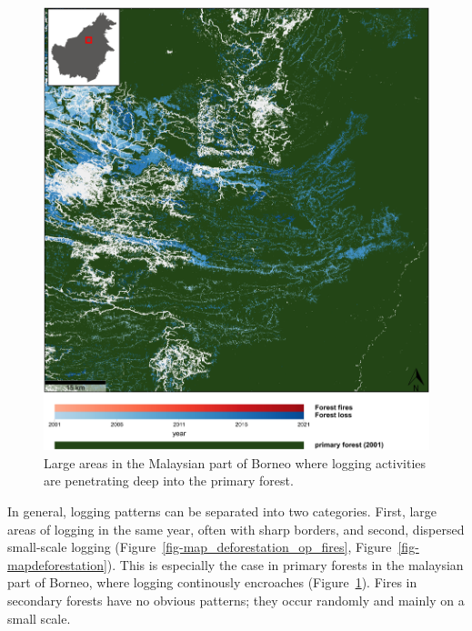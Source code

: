 \documentclass[
  letterpaper,
  DIV=11,
  numbers=noendperiod]{scrreprt}
\begin{document}
\begin{figure}

{\centering \includegraphics{text/../code/results/maps/primary_deforestation.png}

}

\caption{\label{fig-map_deforestation_primary}Large areas in the
Malaysian part of Borneo where logging activities are penetrating deep
into the primary forest.}

\end{figure}

In general, logging patterns can be separated into two categories.
First, large areas of logging in the same year, often with sharp
borders, and second, dispersed small-scale logging
(Figure~\ref{fig-map_deforestation_op_fires},
Figure~\ref{fig-mapdeforestation}). This is especially the case in
primary forests in the malaysian part of Borneo, where logging
continously encroaches (Figure~\ref{fig-map_deforestation_primary}).
Fires in secondary forests have no obvious patterns; they occur randomly
and mainly on a small scale.
\end{document}
